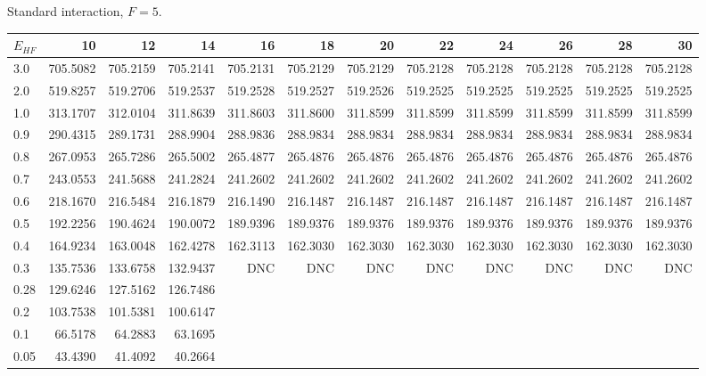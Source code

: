 \begin{landscape}
\begin{table}
\begin{center}
Standard interaction, $F=5$.\\
\begin{tabular}{l|rrrrrrrrrrr}
\hline 
$E_{HF}$ & 10 & 12 & 14 & 16 & 18 & 20 & 22 & 24 & 26 & 28 & 30 \\
\hline \hline
3.0 & 705.5082 & 705.2159 & 705.2141 & 705.2131 & 705.2129 & 705.2129 & 705.2128 & 705.2128 & 705.2128 & 705.2128 & 705.2128 \\ 
2.0 & 519.8257 & 519.2706 & 519.2537 & 519.2528 & 519.2527 & 519.2526 & 519.2525 & 519.2525 & 519.2525 & 519.2525 & 519.2525 \\ 
1.0 & 313.1707 & 312.0104 & 311.8639 & 311.8603 & 311.8600 & 311.8599 & 311.8599 & 311.8599 & 311.8599 & 311.8599 & 311.8599 \\ 
0.9 & 290.4315 & 289.1731 & 288.9904 & 288.9836 & 288.9834 & 288.9834 & 288.9834 & 288.9834 & 288.9834 & 288.9834 & 288.9834 \\ 
0.8 & 267.0953 & 265.7286 & 265.5002 & 265.4877 & 265.4876 & 265.4876 & 265.4876 & 265.4876 & 265.4876 & 265.4876 & 265.4876 \\ 
0.7 & 243.0553 & 241.5688 & 241.2824 & 241.2602 & 241.2602 & 241.2602 & 241.2602 & 241.2602 & 241.2602 & 241.2602 & 241.2602 \\ 
0.6 & 218.1670 & 216.5484 & 216.1879 & 216.1490 & 216.1487 & 216.1487 & 216.1487 & 216.1487 & 216.1487 & 216.1487 & 216.1487 \\ 
0.5 & 192.2256 & 190.4624 & 190.0072 & 189.9396 & 189.9376 & 189.9376 & 189.9376 & 189.9376 & 189.9376 & 189.9376 & 189.9376 \\ 
0.4 & 164.9234 & 163.0048 & 162.4278 & 162.3113 & 162.3030 & 162.3030 & 162.3030 & 162.3030 & 162.3030 & 162.3030 & 162.3030 \\ 
0.3 & 135.7536 & 133.6758 & 132.9437 & DNC & DNC & DNC & DNC & DNC & DNC & DNC & DNC \\
0.28 & 129.6246 & 127.5162 & 126.7486  \\ 
0.2 & 103.7538 & 101.5381 & 100.6147  \\ 
0.1 & 66.5178 & 64.2883 & 63.1695  \\ 
0.05 & 43.4390 & 41.4092 & 40.2664  \\ 
\hline \hline
\end{tabular}
\end{center}
\end{table}
\begin{table}

\end{table}
\end{landscape}
